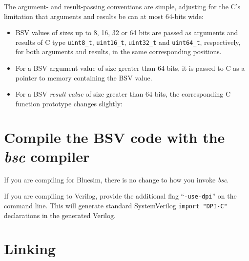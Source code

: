 The argument- and result-passing conventions are simple, adjusting for
the C's limitation that arguments and results be can at most 64-bits
wide:

\begin{itemize}

 \item BSV values of sizes up to 8, 16, 32 or 64 bits are passed as
       arguments and results of C type \verb|uint8_t|,
       \verb|uint16_t|, \verb|uint32_t| and \verb|uint64_t|,
       respectively, for both arguments and results, in the same
       corresponding positions.

 \item For a BSV argument value of size greater than 64 bits, it is
       passed to C as a pointer to memory containing the BSV value.

 \item For a BSV \emph{result value} of size greater than 64 bits, the
       corresponding C function prototype changes slightly:

\end{itemize}


\section{Compile the BSV code with the \emph{bsc} compiler}

If you are compiling for Bluesim, there is no change to how you invoke
\emph{bsc}.

If you are compiling to Verilog, provide the additional flag
``\verb|-use-dpi|'' on the command line.  This will generate standard
SystemVerilog \verb|import "DPI-C"| declarations in the generated
Verilog.


\section{Linking}

